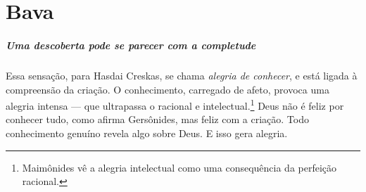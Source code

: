 


\chapter*{Bava \smallskip{}}

\begin{center}
{\huge{}}
\end{center}

\paragraph{Uma descoberta pode se parecer com a completude} Essa sensação, para Hasdai Creskas, se chama \textit{alegria de conhecer}, e está ligada à compreensão da criação. O conhecimento, carregado de afeto, provoca uma alegria intensa --- que ultrapassa o racional e intelectual.\footnote{Maimônides vê a alegria intelectual como uma consequência da perfeição racional.} Deus não é feliz por conhecer tudo, como afirma Gersônides, mas feliz com a criação. Todo conhecimento genuíno revela algo sobre Deus. E isso gera alegria. 

